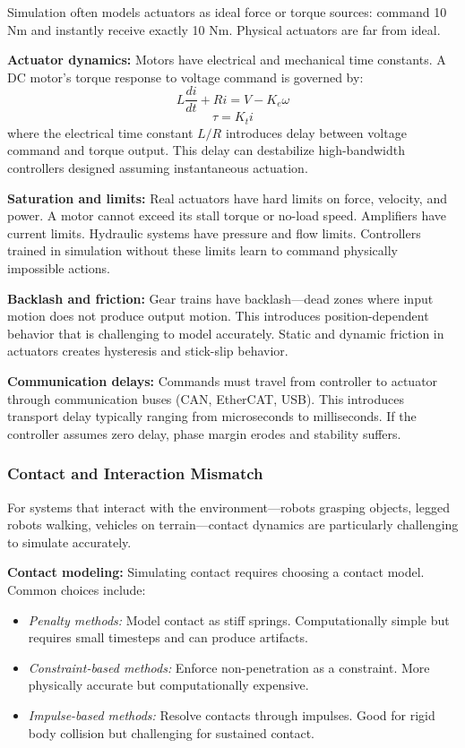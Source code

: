 Simulation often models actuators as ideal force or torque sources: command 10 Nm and instantly receive exactly 10 Nm. Physical actuators are far from ideal.

\textbf{Actuator dynamics:} Motors have electrical and mechanical time constants. A DC motor's torque response to voltage command is governed by:
\begin{equation}
L \frac{di}{dt} + Ri = V - K_e \omega
\end{equation}
\begin{equation}
\tau = K_t i
\end{equation}
where the electrical time constant $L/R$ introduces delay between voltage command and torque output. This delay can destabilize high-bandwidth controllers designed assuming instantaneous actuation.

\textbf{Saturation and limits:} Real actuators have hard limits on force, velocity, and power. A motor cannot exceed its stall torque or no-load speed. Amplifiers have current limits. Hydraulic systems have pressure and flow limits. Controllers trained in simulation without these limits learn to command physically impossible actions.

\textbf{Backlash and friction:} Gear trains have backlash---dead zones where input motion does not produce output motion. This introduces position-dependent behavior that is challenging to model accurately. Static and dynamic friction in actuators creates hysteresis and stick-slip behavior.

\textbf{Communication delays:} Commands must travel from controller to actuator through communication buses (CAN, EtherCAT, USB). This introduces transport delay typically ranging from microseconds to milliseconds. If the controller assumes zero delay, phase margin erodes and stability suffers.

\subsubsection{Contact and Interaction Mismatch}

For systems that interact with the environment---robots grasping objects, legged robots walking, vehicles on terrain---contact dynamics are particularly challenging to simulate accurately.

\textbf{Contact modeling:} Simulating contact requires choosing a contact model. Common choices include:
\begin{itemize}
    \item \textit{Penalty methods:} Model contact as stiff springs. Computationally simple but requires small timesteps and can produce artifacts.
    \item \textit{Constraint-based methods:} Enforce non-penetration as a constraint. More physically accurate but computationally expensive.
    \item \textit{Impulse-based methods:} Resolve contacts through impulses. Good for rigid body collision but challenging for sustained contact.
\end{itemize}

